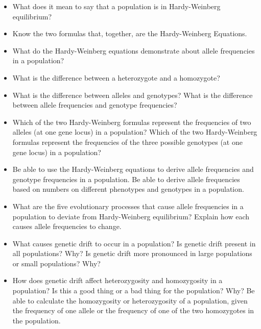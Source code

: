 \documentclass[letterpaper]{tufte-handout}
\begin{document}
\begin{itemize}

	\item What does it mean to say that a population is in Hardy-Weinberg equilibrium?

	\item Know the two formulas that, together, are the Hardy-Weinberg Equations.

	\item What do the Hardy-Weinberg equations demonstrate about allele frequencies in a population?

	\item What is the difference between a heterozygote and a homozygote?

	\item What is the difference between alleles and genotypes?  What is the difference between allele frequencies and genotype frequencies?

	\item Which of the two Hardy-Weinberg formulas represent the frequencies of two alleles (at one gene locus) in a population?  Which of the two Hardy-Weinberg formulas represent the frequencies of the three possible genotypes (at one gene locus) in a population?

	\item Be able to use the Hardy-Weinberg equations to derive allele frequencies and genotype frequencies in a population.  Be able to derive allele frequencies based on numbers on different phenotypes and genotypes in a population. 

	\item What are the five evolutionary processes that cause allele frequencies in a population to deviate from Hardy-Weinberg equilibrium?  Explain how each causes allele frequencies to change.

	\item What causes genetic drift to occur in a population? Is genetic drift present in all populations? Why? Is genetic drift more pronounced in large populations or small populations?  Why?

	\item How does genetic drift affect heterozygosity and homozygosity in a population?  Is this a good thing or a bad thing for the population?  Why?  Be able to calculate the homozygosity or heterozygosity of a population, given the frequency of one allele or the frequency of one of the two homozygotes in the population. 


\end{itemize}
\end{document}
